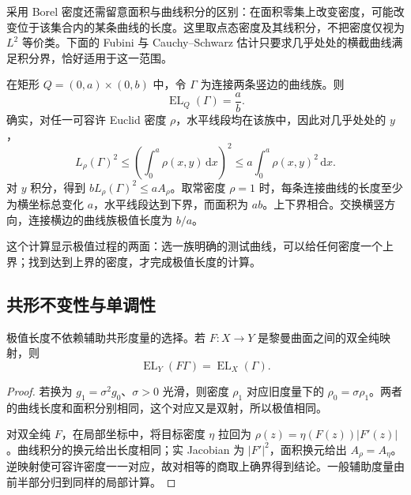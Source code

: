 \ProseParagraphBreak

采用 Borel 密度还需留意面积与曲线积分的区别：在面积零集上改变密度，可能改变位于该集合内的某条曲线的长度。这里取点态密度及其线积分，不把密度仅视为 \(L^2\) 等价类。下面的 Fubini 与 Cauchy--Schwarz 估计只要求几乎处处的横截曲线满足积分界，恰好适用于这一范围。

\begin{example}
	\label{g4:exm:0505:rectangle}
	在矩形 \(Q=(0,a)\times(0,b)\) 中，令 \(\Gamma\) 为连接两条竖边的曲线族。则
	\[
		\operatorname{EL}_Q(\Gamma)=\frac ab.
	\]
	确实，对任一可容许 Euclid 密度 \(\rho\)，水平线段均在该族中，因此对几乎处处的 \(y\)，
	\[
		L_\rho(\Gamma)^2\le
		\left(\int_0^a\rho(x,y)\,\mathrm{d}x\right)^2
		\le a\int_0^a\rho(x,y)^2\,\mathrm{d}x.
	\]
	对 \(y\) 积分，得到 \(bL_\rho(\Gamma)^2\le aA_\rho\)。取常密度 \(\rho=1\) 时，每条连接曲线的长度至少为横坐标总变化 \(a\)，水平线段达到下界，而面积为 \(ab\)。上下界相合。交换横竖方向，连接横边的曲线族极值长度为 \(b/a\)。
\end{example}

这个计算显示极值过程的两面：选一族明确的测试曲线，可以给任何密度一个上界；找到达到上界的密度，才完成极值长度的计算。

\subsection{共形不变性与单调性}
\label{g4:subsec:0505:02}

\begin{proposition}
	\label{g4:prop:0505:conformal-invariance}
	极值长度不依赖辅助共形度量的选择。若 \(F:X\to Y\) 是黎曼曲面之间的双全纯映射，则
	\[
		\operatorname{EL}_Y(F\Gamma)=\operatorname{EL}_X(\Gamma).
	\]
\end{proposition}
\begin{proof}
	若换为 \(g_1=\sigma^2g_0\)、\(\sigma>0\) 光滑，则密度 \(\rho_1\) 对应旧度量下的 \(\rho_0=\sigma\rho_1\)。两者的曲线长度和面积分别相同，这个对应又是双射，所以极值相同。

	对双全纯 \(F\)，在局部坐标中，将目标密度 \(\eta\) 拉回为 \(\rho(z)=\eta(F(z))|F'(z)|\)。曲线积分的换元给出长度相同；实 Jacobian 为 \(|F'|^2\)，面积换元给出 \(A_\rho=A_\eta\)。逆映射使可容许密度一一对应，故对相等的商取上确界得到结论。一般辅助度量由前半部分归到同样的局部计算。
\end{proof}


